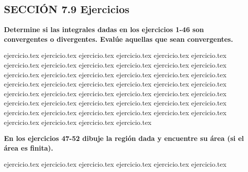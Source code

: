 \subsection*{SECCIÓN 7.9 \quad Ejercicios}

\noindent\textbf{Determine si las integrales dadas en los ejercicios 1-46 son convergentes o divergentes. Evalúe aquellas que sean convergentes.}
\begin{enumerate}
    {ejercicio.tex}
{ejercicio.tex}
{ejercicio.tex}
{ejercicio.tex}
{ejercicio.tex}
{ejercicio.tex}
{ejercicio.tex}
{ejercicio.tex}
{ejercicio.tex}
{ejercicio.tex}
{ejercicio.tex}
{ejercicio.tex}
{ejercicio.tex}
{ejercicio.tex}
{ejercicio.tex}
{ejercicio.tex}
{ejercicio.tex}
{ejercicio.tex}
{ejercicio.tex}
{ejercicio.tex}
{ejercicio.tex}
{ejercicio.tex}
{ejercicio.tex}
{ejercicio.tex}
{ejercicio.tex}
{ejercicio.tex}
{ejercicio.tex}
{ejercicio.tex}
{ejercicio.tex}
{ejercicio.tex}
{ejercicio.tex}
{ejercicio.tex}
{ejercicio.tex}
{ejercicio.tex}
{ejercicio.tex}
{ejercicio.tex}
{ejercicio.tex}
{ejercicio.tex}
{ejercicio.tex}
{ejercicio.tex}
{ejercicio.tex}
{ejercicio.tex}
{ejercicio.tex}
{ejercicio.tex}
{ejercicio.tex}
{ejercicio.tex}
\end{enumerate}

\vspace{0.5cm}
\noindent\textbf{En los ejercicios 47-52 dibuje la región dada y encuentre su área (si el área es finita).}
\begin{enumerate}
    \setcounter{enumi}{46}
    {ejercicio.tex}
{ejercicio.tex}
{ejercicio.tex}
{ejercicio.tex}
{ejercicio.tex}
{ejercicio.tex}
\end{enumerate}

